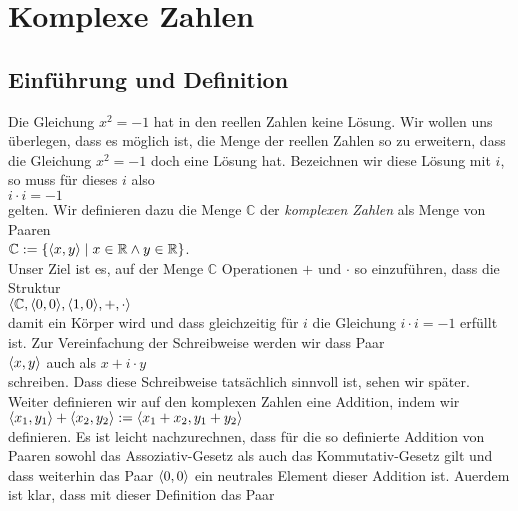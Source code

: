 \chapter{Komplexe Zahlen}

\section{Einf\"{u}hrung und Definition}
Die Gleichung $x^2 = -1$ hat in den reellen Zahlen keine L\"{o}sung.  Wir wollen uns \"{u}berlegen,
dass es m\"{o}glich ist, die Menge der reellen Zahlen so zu erweitern, dass die
Gleichung $x^2 = -1$ doch eine L\"{o}sung hat.  Bezeichnen wir diese L\"{o}sung mit $i$, so muss
f\"{u}r dieses $i$ also
\\[0.2cm]
\hspace*{1.3cm}
$i \cdot i = -1$
\\[0.2cm]
gelten.  Wir definieren dazu die Menge $\mathbb{C}$ der \emph{komplexen Zahlen} als Menge
von Paaren
\\[0.2cm]
\hspace*{1.3cm}
$\mathbb{C} := \{ \pair(x,y) \mid x \in \mathbb{R} \wedge y \in \mathbb{R} \}$.
\\[0.2cm]
Unser Ziel ist es, auf der Menge $\mathbb{C}$ Operationen $+$ und $\cdot$ so einzuf\"{u}hren, dass
die Struktur
\\[0.2cm]
\hspace*{1.3cm}
$\langle \mathbb{C}, \pair(0,0), \pair(1,0), +, \cdot \rangle$
\\[0.2cm]
damit ein K\"{o}rper wird und dass gleichzeitig f\"{u}r $i$ die Gleichung $i \cdot i = -1$ erf\"{u}llt
ist.  Zur Vereinfachung der Schreibweise werden wir dass Paar 
\\[0.2cm]
\hspace*{1.3cm}
$\pair(x,y)$ \quad auch als \quad $x + i \cdot y$
\\[0.2cm]
schreiben.  Dass diese Schreibweise tats\"{a}chlich sinnvoll ist, sehen wir sp\"{a}ter.
Weiter definieren wir auf den komplexen Zahlen eine Addition, indem wir 
\\[0.2cm]
\hspace*{1.3cm}
$\pair(x_1,y_1) + \pair(x_2, y_2) := \pair(x_1 + x_2, y_1 + y_2)$
\\[0.2cm]
definieren.  Es ist leicht nachzurechnen, dass f\"{u}r die so definierte Addition von Paaren
sowohl das Assoziativ-Gesetz als auch das Kommutativ-Gesetz gilt und dass weiterhin das
Paar $\pair(0,0)$ ein neutrales Element 
dieser Addition ist.  Au\3erdem ist klar, dass mit dieser Definition das Paar
